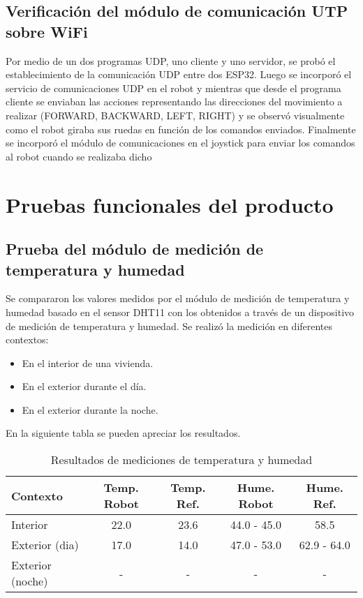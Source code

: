 \subsection{Verificación del módulo de comunicación UTP sobre WiFi}
Por medio de un dos programas UDP, uno cliente y uno servidor, se probó el establecimiento de la comunicación UDP entre dos ESP32. Luego se incorporó el servicio de comunicaciones UDP en el robot y mientras que desde el programa cliente se enviaban las acciones representando las direcciones del movimiento a realizar (FORWARD, BACKWARD, LEFT, RIGHT) y se observó visualmente como el robot giraba sus ruedas en función de los comandos enviados. Finalmente se incorporó el módulo de comunicaciones en el joystick para enviar los comandos al robot cuando se realizaba dicho


\section{Pruebas funcionales del producto}


\subsection{Prueba del módulo de medición de temperatura y humedad}

Se compararon los valores medidos por el módulo de medición de temperatura y humedad basado en el sensor DHT11 con los obtenidos a través de un dispositivo de medición de temperatura y humedad. Se realizó la medición en diferentes contextos:

\begin{itemize}
	\item En el interior de una vivienda.
	\item En el exterior durante el día.
	\item En el exterior durante la noche.
\end{itemize}

En la siguiente tabla se pueden apreciar los resultados.

\begin{table}[h]
\centering
\caption[Resultados de mediciones de temperatura y humedad]{Resultados de mediciones de temperatura y humedad}
\begin{tabular}{l c c c c}
\toprule
\textbf{Contexto} & \textbf{Temp. Robot} & \textbf{Temp. Ref.} & \textbf{Hume. Robot}  & \textbf{Hume. Ref.}\\
\midrule
Interior & 22.0 & 23.6 & 44.0 - 45.0 & 58.5 \\
Exterior (dia) & 17.0  & 14.0 & 47.0 - 53.0 & 62.9 - 64.0 \\
Exterior (noche) & - & - & - & - \\
\bottomrule
\hline
\end{tabular}
\end{table}

